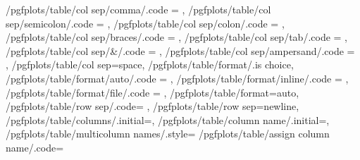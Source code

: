 {	/pgfplots/table/col sep/comma/.code		= {\def\pgfplotstableread@COLSEP@CASE{1}},
	/pgfplots/table/col sep/semicolon/.code	= {\def\pgfplotstableread@COLSEP@CASE{2}},
	/pgfplots/table/col sep/colon/.code		= {\def\pgfplotstableread@COLSEP@CASE{3}},
	/pgfplots/table/col sep/braces/.code	= {\def\pgfplotstableread@COLSEP@CASE{4}},
	/pgfplots/table/col sep/tab/.code		= {\def\pgfplotstableread@COLSEP@CASE{5}},
	/pgfplots/table/col sep/&/.code			= {\def\pgfplotstableread@COLSEP@CASE{6}},
	/pgfplots/table/col sep/ampersand/.code	= {\def\pgfplotstableread@COLSEP@CASE{6}},
	/pgfplots/table/col sep=space,
	/pgfplots/table/format/.is choice,
	/pgfplots/table/format/auto/.code		= {\def\pgfplotstableread@FORMAT@CASE{0}},
	/pgfplots/table/format/inline/.code		= {\def\pgfplotstableread@FORMAT@CASE{1}},
	/pgfplots/table/format/file/.code		= {\def\pgfplotstableread@FORMAT@CASE{2}},
	/pgfplots/table/format=auto,
	/pgfplots/table/row sep/.code={%
	},%
	/pgfplots/table/row sep=newline,
	/pgfplots/table/columns/.initial=,
	/pgfplots/table/column name/.initial=\pgfkeysnovalue,
	/pgfplots/table/multicolumn names/.style={%
		/pgfplots/table/assign column name/.code={%
}}}
